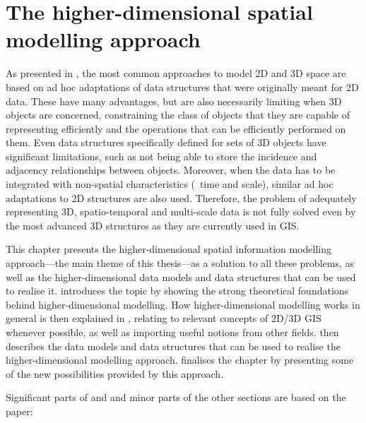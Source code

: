 
\chapter{The higher-dimensional spatial modelling approach}
\label{ch:nd-modelling}

As presented in , the most common approaches to model 2D and 3D space are based on ad hoc adaptations of data structures that were originally meant for 2D data.
These have many advantages, but are also necessarily limiting when 3D objects are concerned, constraining the class of objects that they are capable of representing efficiently and the operations that can be efficiently performed on them.
Even data structures specifically defined for sets of 3D objects have significant limitations, such as not being able to store the incidence and adjacency relationships between objects.
Moreover, when the data has to be integrated with non-spatial characteristics (\eg\ time and scale), similar ad hoc adaptations to 2D structures are also used.
Therefore, the problem of adequately representing 3D, spatio-temporal and multi-scale data is not fully solved even by the most advanced 3D structures as they are currently used in GIS.\@

This chapter presents the higher-dimensional spatial information modelling approach---the main theme of this thesis---as a solution to all these problems, as well as the higher-dimensional data models and data structures that can be used to realise it.
 introduces the topic by showing the strong theoretical foundations behind higher-dimensional modelling.
How higher-dimensional modelling works in general is then explained in , relating to relevant concepts of 2D/3D GIS whenever possible, as well as importing useful notions from other fields.
 then describes the data models and data structures that can be used to realise the higher-dimensional modelling approach.
 finalises the chapter by presenting some of the new possibilities provided by this approach.

Significant parts of  and  and minor parts of the other sections are based on the paper:
\begin{itemize}
\paperijgisndstructures%
\end{itemize}

